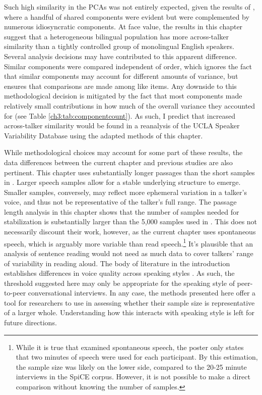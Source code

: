 Such high similarity in the PCAs was not entirely expected, given the results of \citet{lee_2019_acoustic}, where a handful of shared components were evident but were complemented by numerous idiosyncratic components. At face value, the results in this chapter suggest that a heterogeneous bilingual population has more across-talker similarity than a tightly controlled group of monolingual English speakers. Several analysis decisions may have contributed to this apparent difference. Similar components were compared independent of order, which ignores the fact that similar components may account for different amounts of variance, but ensures that comparisons are made among like items. Any downside to this methodological decision is mitigated by the fact that most components made relatively small contributions in how much of the overall variance they accounted for (see Table \ref{ch3:tab:componentcount}). As such, I predict that increased across-talker similarity would be found in a reanalysis of the UCLA Speaker Variability Database \citep{keating_2019_database} using the adapted methods of this chapter. 

While methodological choices may account for some part of these results, the data differences between the current chapter and previous studies are also pertinent. This chapter uses substantially longer passages than the short samples in \citet{lee_2019_acoustic}. Larger speech samples allow for a stable underlying structure to emerge. Smaller samples, conversely, may reflect more ephemeral variation in a talker's voice, and thus not be representative of the talker's full range. The passage length analysis in this chapter shows that the number of samples needed for stabilization is substantially larger than the 5,000 samples used in \citet{lee_2019_acoustic}. This does not necessarily discount their work, however, as the current chapter uses spontaneous speech, which is arguably more variable than read speech.\footnote{While it is true that \citet{lee_2019_spontaneous} examined spontaneous speech, the poster only states that two minutes of speech were used for each participant. By this estimation, the sample size was likely on the lower side, compared to the 20-25 minute interviews in the SpiCE corpus. However, it is not possible to make a direct comparison without knowing the number of samples.} It's plausible that an analysis of sentence reading would not need as much data to cover talkers' range of variability in reading aloud. The body of literature in the introduction establishes differences in voice quality across speaking styles \citep[e.g.,][]{lee_2017_bilingual}. As such, the threshold suggested here may only be appropriate for the speaking style of peer-to-peer conversational interviews. In any case, the methods presented here offer a tool for researchers to use in assessing whether their sample size is representative of a larger whole. Understanding how this interacts with speaking style is left for future directions. 

